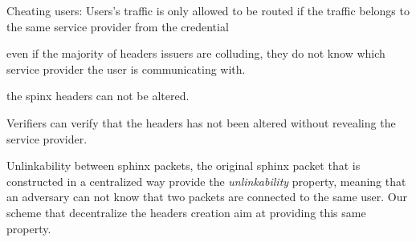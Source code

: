 \begin{objectives}
%
        \item Cheating users: Users's traffic is only allowed to be routed
if the traffic belongs to the same service provider from the credential
%
        \item even if the majority of headers issuers are colluding, they
do not know which service provider the user is communicating with.
%
        \item the spinx headers can not be altered.
%
        \item Verifiers can verify that the headers has not been altered
without revealing the service provider.
%
        \item Unlinkability between  sphinx packets, the original sphinx
packet that is constructed in a centralized way provide the
\textit{unlinkability} property, meaning that an adversary can not know
that two packets are connected to the same user. Our scheme that
decentralize the headers creation aim at providing this same property.
%
\end{objectives}


